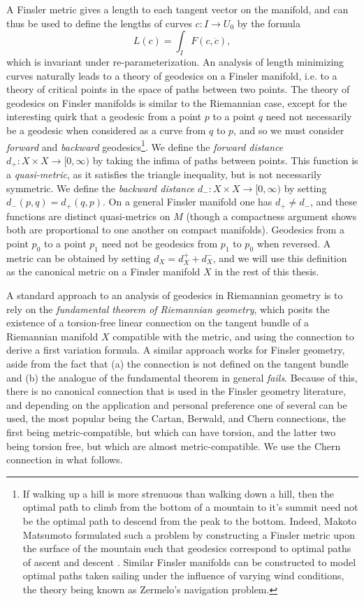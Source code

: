 A Finsler metric gives a length to each tangent vector on the manifold, and can thus be used to define the lengths of curves $c: I \to U_0$ by the formula
%
\begin{equation}
  L(c) = \int_I F(c,\dot{c}),
\end{equation}
%
which is invariant under re-parameterization. An analysis of length minimizing curves naturally leads to a theory of geodesics on a Finsler manifold, i.e. to a theory of critical points in the space of paths between two points. The theory of geodesics on Finsler manifolds is similar to the Riemannian case, except for the interesting quirk that a geodesic from a point $p$ to a point $q$ need not necessarily be a geodesic when considered as a curve from $q$ to $p$, and so we must consider \emph{forward} and \emph{backward} geodesics\footnote{If walking up a hill is more strenuous than walking down a hill, then the optimal path to climb from the bottom of a mountain to it's summit need not be the optimal path to descend from the peak to the bottom. Indeed, Makoto Matsumoto formulated such a problem by constructing a Finsler metric upon the surface of the mountain such that geodesics correspond to optimal paths of ascent and descent \cite{Matsumoto}. Similar Finsler manifolds can be constructed to model optimal paths taken sailing under the influence of varying wind conditions, the theory being known as Zermelo's navigation problem.}. We define the \emph{forward distance} $d_+: X \times X \to [0,\infty)$ by taking the infima of paths between points. This function is a \emph{quasi-metric}, as it satisfies the triangle inequality, but is not necessarily symmetric. We define the \emph{backward distance} $d_-: X \times X \to [0,\infty)$ by setting $d_-(p,q) = d_+(q,p)$. On a general Finsler manifold one has $d_+ \neq d_-$, and these functions are distinct quasi-metrics on $M$ (though a compactness argument shows both are proportional to one another on compact manifolds). Geodesics from a point $p_0$ to a point $p_1$ need not be geodesics from $p_1$ to $p_0$ when reversed. A metric can be obtained by setting $d_X = d_X^+ + d_X^-$, and we will use this definition as the canonical metric on a Finsler manifold $X$ in the rest of this thesis.

A standard approach to an analysis of geodesics in Riemannian geometry is to rely on the \emph{fundamental theorem of Riemannian geometry}, which posits the existence of a torsion-free linear connection on the tangent bundle of a Riemannian manifold $X$ compatible with the metric, and using the connection to derive a first variation formula. A similar approach works for Finsler geometry, aside from the fact that (a) the connection is not defined on the tangent bundle and (b) the analogue of the fundamental theorem in general \emph{fails}. Because of this, there is no canonical connection that is used in the Finsler geometry literature, and depending on the application and personal preference one of several can be used, the most popular being the Cartan, Berwald, and Chern connections, the first being metric-compatible, but which can have torsion, and the latter two being torsion free, but which are almost metric-compatible. We use the Chern connection in what follows.

